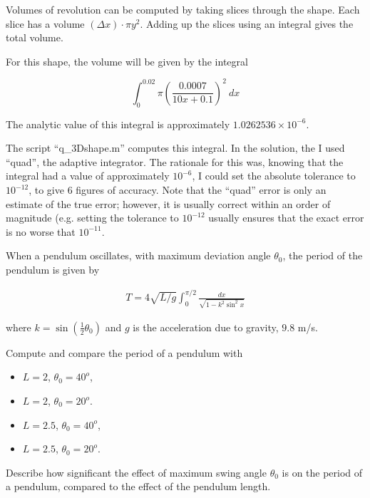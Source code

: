 \begin{Solution}

  Volumes of revolution can be computed by taking slices through the
  shape.  Each slice has a volume $(\Delta x) \cdot \pi y^2$.  Adding
  up the slices using an integral gives the total volume.

  For this shape, the volume will be given by the integral
  
  $$\int_0^{0.02} \pi \left(\frac{0.0007}{10 x + 0.1}\right)^2 ~dx$$

  The analytic value of this integral is approximately $1.0262536
  \times 10^{-6}$.

  The script ``q\_3Dshape.m'' computes this integral. In the solution,
  the I used ``quad'', the adaptive integrator.  The rationale for
  this was, knowing that the integral had a value of approximately
  $10^{-6}$, I could set the absolute tolerance to $10^{-12}$, to give
  6 figures of accuracy.  Note that the ``quad'' error is only an
  estimate of the true error; however, it is usually correct within an
  order of magnitude (e.g. setting the tolerance to $10^{-12}$ usually
  ensures that the exact error is no worse that $10^{-11}$.

\end{Solution}


\item When a pendulum oscillates, with maximum deviation angle
  $\theta_0$, the period of the pendulum is given by

\begin{align*}
  T = 4 \sqrt{L/g} \int_0^{\pi/2} \frac{dx}{\sqrt{1 - k^2 \sin^2 x}}
\end{align*}

where $k = \sin\left(\frac{1}{2} \theta_0\right)$ and $g$ is the
acceleration due to gravity, $9.8 $ m/s.

Compute and compare the period of a pendulum with 
\begin{itemize}
\item $L = 2$, $\theta_0 = 40^o$, 
\item $L =2$, $\theta_0 = 20^o$.
\item $L = 2.5$, $\theta_0 = 40^o$, 
\item $L =2.5$, $\theta_0 = 20^o$.
\end{itemize}

Describe how significant the effect of maximum swing angle $\theta_0$
is on the period of a pendulum, compared to the effect of the pendulum
length.


